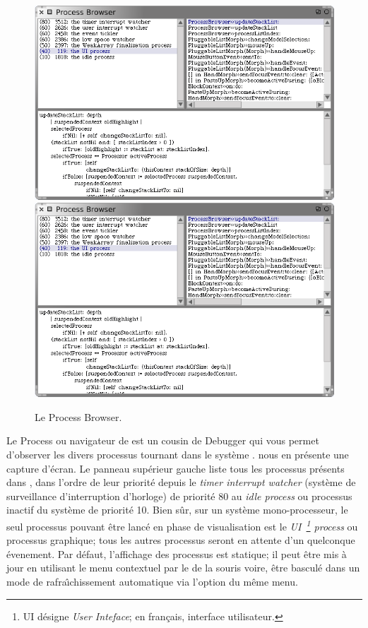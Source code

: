 \documentclass[a4paper,10pt,twoside]{book}
\begin{document}
\begin{figure}[btp]
	\begin{center}
	\ifluluelse
		{\includegraphics[width=\textwidth]{processBrowser}}
		{\includegraphics[scale=0.7]{processBrowser}}
	\end{center}
	\caption{Le Process Browser.}
	\label{fig:processBrowser}
\end{figure}

Le Process  ou navigateur de  
est un cousin de Debugger qui vous permet d'observer les divers processus tournant
dans le syst\`eme \sq.
 nous en pr\'esente une capture d'\'ecran.
Le panneau sup\'erieur gauche liste tous les processus pr\'esents dans \sq, 
dans l'ordre de leur priorit\'e depuis le \emph{timer interrupt watcher} 
(syst\`eme de surveillance d'interruption d'horloge) de priorit\'e
80 au \emph{idle process} ou processus inactif du syst\`eme de priorit\'e 10.
Bien s\^ur, sur un syst\`eme mono-processeur, le seul processus pouvant \^etre 
lanc\'e en phase de visualisation est le \emph{UI~\footnote{UI d\'esigne 
\emph{User Inteface}; en fran\c{c}ais, interface utilisateur.} process} 
ou processus graphique;
tous les autres processus seront en attente d'un quelconque \'evenement.
Par d\'efaut, l'affichage des processus est statique; il peut \^etre mis \`a jour
en utilisant le menu contextuel par le  de la souris voire,
\^etre bascul\'e dans un mode de rafra\^{\i}chissement automatique
via l'option  du m\^eme menu.
\end{document}
